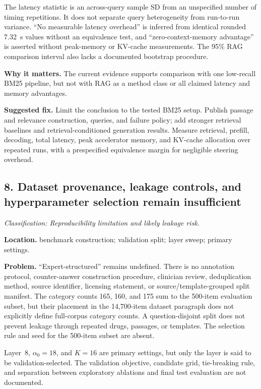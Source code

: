 \documentclass[11pt]{article}
\newcommand{\findinglabel}[1]{\textbf{#1}}
\newcommand{\classification}[1]{\textit{Classification: #1.}}
\begin{document}
The latency statistic is an across-query sample SD from an unspecified number of timing repetitions.  It does not separate query heterogeneity from run-to-run variance.  ``No measurable latency overhead'' is inferred from identical rounded 7.32~s values without an equivalence test, and ``zero-context-memory advantage'' is asserted without peak-memory or KV-cache measurements.  The 95\% RAG comparison interval also lacks a documented bootstrap procedure.

\findinglabel{Why it matters.} The current evidence supports comparison with one low-recall BM25 pipeline, but not with RAG as a method class or all claimed latency and memory advantages.

\findinglabel{Suggested fix.} Limit the conclusion to the tested BM25 setup.  Publish passage and relevance construction, queries, and failure policy; add stronger retrieval baselines and retrieval-conditioned generation results.  Measure retrieval, prefill, decoding, total latency, peak accelerator memory, and KV-cache allocation over repeated runs, with a prespecified equivalence margin for negligible steering overhead.

\subsection*{8. Dataset provenance, leakage controls, and hyperparameter selection remain insufficient}

\classification{Reproducibility limitation and likely leakage risk}

\findinglabel{Location.} benchmark construction; validation split; layer sweep; primary settings.

\findinglabel{Problem.} ``Expert-structured'' remains undefined.  There is no annotation protocol, counter-answer construction procedure, clinician review, deduplication method, source identifier, licensing statement, or source/template-grouped split manifest.  The category counts 165, 160, and 175 sum to the 500-item evaluation subset, but their placement in the 14,700-item dataset paragraph does not explicitly define full-corpus category counts.  A question-disjoint split does not prevent leakage through repeated drugs, passages, or templates.  The selection rule and seed for the 500-item subset are absent.

Layer~8, $\alpha_0=18$, and $K=16$ are primary settings, but only the layer is said to be validation-selected.  The validation objective, candidate grid, tie-breaking rule, and separation between exploratory ablations and final test evaluation are not documented.
\end{document}
